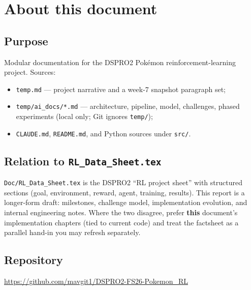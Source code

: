 \chapter{About this document}

\section*{Purpose}
Modular documentation for the DSPRO2 Pok\'{e}mon reinforcement-learning project. Sources:
\begin{itemize}
  \item \texttt{temp.md} --- project narrative and a week-7 snapshot paragraph set;
  \item \texttt{temp/ai\_docs/*.md} --- architecture, pipeline, model, challenges, phased experiments (local only; Git ignores \texttt{temp/});
  \item \texttt{CLAUDE.md}, \texttt{README.md}, and Python sources under \texttt{src/}.
\end{itemize}

\section*{Relation to \texttt{RL\_Data\_Sheet.tex}}
\texttt{Doc/RL\_Data\_Sheet.tex} is the DSPRO2 ``RL project sheet'' with structured sections (goal, environment, reward, agent, training, results). This report is a longer-form draft: milestones, challenge model, implementation evolution, and internal engineering notes. Where the two disagree, prefer \textbf{this} document's implementation chapters (tied to current code) and treat the factsheet as a parallel hand-in you may refresh separately.

\section*{Repository}
\url{https://github.com/mavgit1/DSPRO2-FS26-Pokemon_RL}
